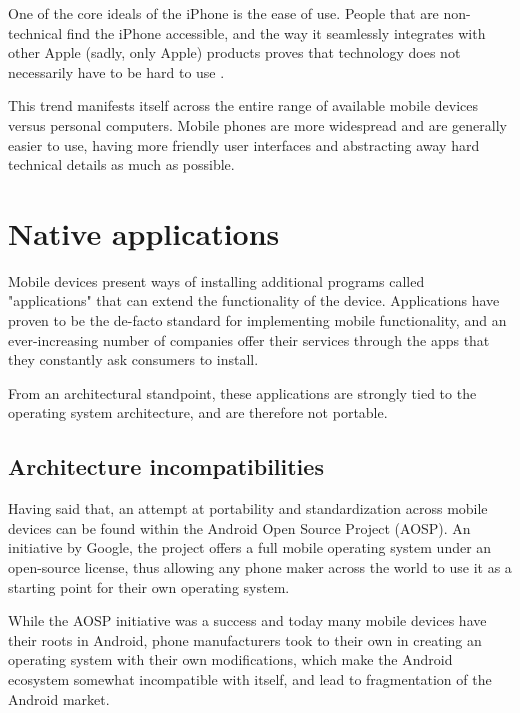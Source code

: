One of the core ideals of the iPhone is the ease of use. People that are non-technical find the iPhone accessible, and the way it seamlessly integrates with other Apple (sadly, only Apple) products proves that technology does not necessarily have to be hard to use \cite{SlashGearIPhoneOverAndroid}.

This trend manifests itself across the entire range of available mobile devices versus personal computers. Mobile phones are more widespread and are generally easier to use, having more friendly user interfaces and abstracting away hard technical details as much as possible.

\section{Native applications}

Mobile devices present ways of installing additional programs called "applications" that can extend the functionality of the device. Applications have proven to be the de-facto standard for implementing mobile functionality, and an ever-increasing number of companies offer their services through the apps that they constantly ask consumers to install.

From an architectural standpoint, these applications are strongly tied to the operating system architecture, and are therefore not portable.

\subsection{Architecture incompatibilities}

Having said that, an attempt at portability and standardization across mobile devices can be found within the Android Open Source Project (AOSP). An initiative by Google, the project offers a full mobile operating system under an open-source license, thus allowing any phone maker across the world to use it as a starting point for their own operating system.

While the AOSP initiative was a success and today many mobile devices have their roots in Android, phone manufacturers took to their own in creating an operating system with their own modifications, which make the Android ecosystem somewhat incompatible with itself, and lead to fragmentation of the Android market.

